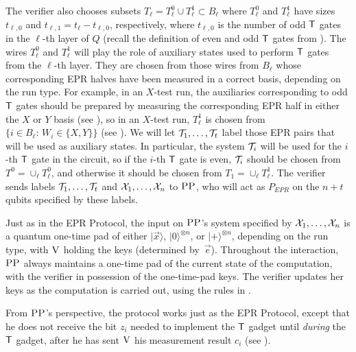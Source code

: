 \documentclass{toc}
\newcommand{\ket}[1]{|#1\rangle}
\newcommand{\ver}{\textsc{V}}
\newcommand{\pp}{\textsc{PP}}
\begin{document}
The verifier also chooses subsets
$T_\ell = T_\ell^0 \cup T_\ell^1 \subset B_\ell$ 
where $T_\ell^0$ and $T_\ell^1$ have %
sizes $t_{\ell,0}$ and $t_{\ell,1} = t_\ell-t_{\ell,0}$, respectively,
where $t_{\ell,0}$ is the number of odd $\sf T$ gates in the $\ell$-th layer of $Q$ (recall the definition of even and odd $\sf T$ gates from ). The wires $T^0_\ell$ and $T^1_\ell$ will play the role of auxiliary states used to perform $\sf T$ gates from the $\ell$-th layer. They are chosen from those wires from $B_\ell$ whose corresponding EPR halves have been measured in a correct basis, depending on the run type.  For example, in an $X$-test run, the auxiliaries corresponding to odd $\sf T$ gates should be prepared by measuring the corresponding EPR half in either the $X$ or $Y$ basis (see ), so in an $X$-test run, $T_\ell^1$ is chosen from $\{i\in B_\ell:\,W_i\in \{X,Y\}\}$ (see ). We will let ${\cal T}_1,\dots,{\cal T}_t$ label those EPR pairs that will be used as auxiliary states. In particular, the system ${\cal T}_i$ will be used for the $i$-th $\sf T$ gate in the circuit, so if the $i$-th $\sf T$ gate is even, ${\cal T}_i$ should be chosen from $T^0=\cup_\ell T_\ell^0$, and otherwise it should be chosen from $T_1=\cup_\ell T_\ell^1$. The verifier sends labels ${\cal T}_1,\dots,{\cal T}_t$ and ${\cal X}_1,\dots,{\cal X}_n$ to $\pp$, who will act as $P_{EPR}$ on the $n+t$ qubits specified by these labels.


Just as in the EPR Protocol, the input on $\pp$'s system specified by ${\cal X}_1,\dots,{\cal X}_n$ is a quantum one-time pad of either $\ket{\vec{x}}$, $\ket{0}^{\otimes n}$, or $\ket{+}^{\otimes n}$, depending on the run type, with $\ver$ holding the keys (determined by~$\vec{e}$). Throughout the interaction, $\pp$ always maintains a one-time pad of the current state of the computation, with the verifier in possession of the one-time-pad keys. The verifier updates her keys as the computation is carried out, using the rules in . 




From $\pp$'s perspective, the protocol works just as the EPR Protocol, except that he does not receive the bit $z_i$ needed to implement the $\sf T$ gadget until \emph{during} the $\sf T$ gadget, after he has sent $\ver$ his measurement result $c_i$ (see ).
\end{document}
